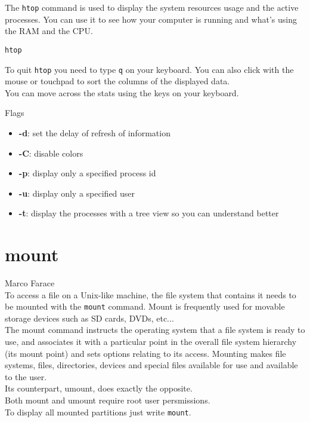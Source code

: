 \documentclass[hidelinks,12pt,a4paper,numbers=enddot]{scrartcl}
\begin{document}
The \texttt{htop} command is used to display the system resources
usage and the active processes.
You can use it to see how your computer is running and what's using the
RAM and the CPU.

\begin{verbatim}
htop
\end{verbatim}

To quit \texttt{htop} you need to type \texttt{q} on your keyboard. You can also click
with the mouse or touchpad to sort the columns of the displayed data.\\
You can move across the stats using the keys on your keyboard.

Flags

\begin{itemize}
    \item \textbf{-d}: set the delay of refresh of information
    \item \textbf{-C}: disable colors
    \item \textbf{-p}: display only a specified process id
    \item \textbf{-u}: display only a specified user
    \item \textbf{-t}: display the processes with a tree view so you can understand better
\end{itemize}

\section{mount}


\large Marco Farace \normalsize\\


To access a file on a Unix-like machine, the file system that contains it
needs to be mounted with the \texttt{mount} command. Mount is frequently used for
movable storage devices such as SD cards, DVDs, etc...\\

The mount command instructs the operating system that a file system is ready to
use, and associates it with a particular point in the overall file system
hierarchy (its mount point) and sets options relating to its access. Mounting
makes file systems, files, directories, devices and special files available for
use and available to the user.\\

Its counterpart, umount, does exactly the opposite.\\
Both mount and umount require root user persmissions.\\
To display all mounted partitions just write \texttt{mount}.\\
\end{document}
